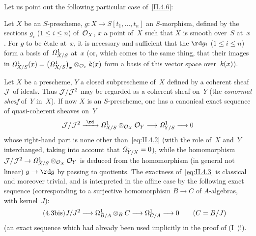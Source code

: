 Let us point out the following particular case of~\ref{II.4.6}:
\begin{corollary}
\label{II.4.8}
Let $X$ be an $S$-prescheme, $g\colon X\to
S[t_{1},\dots,t_{n}]$ an $S$-morphism, defined by the sections
$g_{i}$ ($1\le i\le n$) of~$\cal{O}_{X}$, $x$ a point of~$X$ such that
$X$ is smooth over~$S$ at~$x$. For $g$ to be \'etale at~$x$, it
is necessary and sufficient that the $\rd g_{i}$
($1\le i\le n$) form a basis of~$\it{\Omega}^1_{X/S}$ at~$x$ (or,
which comes to the same thing, that their images in
$\it{\Omega}^1_{X/S}(x) =
\big(\it{\Omega}^1_{X/S}\big)_{x}\otimes_{\cal{O}_{x}}\kres(x)$ form
a basis of this vector space over~$\kres(x)$).
\end{corollary}

Let $X$ be a prescheme, $Y$ a closed subprescheme
of~$X$ defined by a coherent sheaf $\cal{J}$
of ideals. Thus $\cal{J}/\cal{J}^2$ may be regarded
as a coherent sheaf on~$Y$ (the \emph{conormal sheaf}
of~$Y$ in~$X$). If now $X$ is an $S$-prescheme, one has
a canonical exact sequence of quasi-coherent sheaves on~$Y$
\begin{equation}
\label{eq:II.4.3}
\cal{J}/\cal{J}^2\lto{\rd}
\it{\Omega}^1_{X/S}\otimes_{\cal{O}_{X}}\cal{O}_{Y}\to
\it{\Omega}^1_{Y/S}\to 0
\end{equation}
whose right-hand part is none other than~\eqref{eq:II.4.2} (with the
role of~$X$ and~$Y$ interchanged, taking into account that
$\it{\Omega}^1_{Y/X}=0$), while the homomorphism
$\cal{J}/\cal{J}^2\to\it{\Omega}^1_{X/S}\otimes_{\cal{O}_{X}}\cal{O}_{Y}$
is deduced from the homomorphism (in general not
linear) $g\to\rd g$ by passing to
quotients. The exactness of~\eqref{eq:II.4.3} is classical and
moreover trivial, and is interpreted in the affine case by the
following exact sequence (corresponding to a surjective homomorphism
$B\to C$ of $A$-algebras, with kernel~$J$):
\begin{equation*}
\label{eq:II.4.3bis}
\tag{4.3\textrm{bis}}
J/J^2\to\Omega^1_{B/A}\otimes_{B}C\to\Omega^1_{C/A}\to 0\qquad
(C=B/J)
\end{equation*}
(an exact sequence which had already been used
implicitly in the proof of (I~)!).
